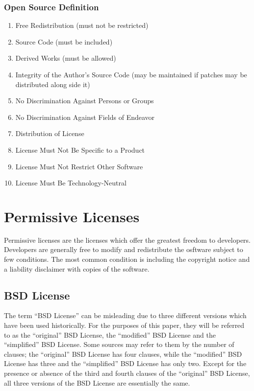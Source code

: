 \documentclass[12pt,letterpaper]{article}
\begin{document}
\subsubsection*{Open Source Definition}
\begin{enumerate}
\item Free Redistribution (must not be restricted)
\item Source Code (must be included)
\item Derived Works (must be allowed)
\item Integrity of the Author's Source Code (may be maintained if patches may be distributed along side it)
\item No Discrimination Against Persons or Groups
\item No Discrimination Against Fields of Endeavor
\item Distribution of License
\item License Must Not Be Specific to a Product
\item License Must Not Restrict Other Software
\item License Must Be Technology-Neutral
\end{enumerate}

\section{Permissive Licenses}

Permissive licenses are the licenses which offer the greatest freedom to developers. Developers are generally free to modify and redistribute the osftware subject to few conditions. The most common condition is including the copyright notice and a liability disclaimer with copies of the software.

\subsection{BSD License}

The term ``BSD License'' can be misleading due to three different versions which have been used historically.\cite{netbsd} For the purposes of this paper, they will be referred to as the ``original'' BSD License, the ``modified'' BSD License and the ``simplified'' BSD License. Some sources may refer to them by the number of clauses; the ``original'' BSD License has four clauses, while the ``modified'' BSD License has three and the ``simplified'' BSD License has only two. Except for the presence or absence of the third and fourth clauses of the ``original'' BSD License, all three versions of the BSD License are essentially the same.
\end{document}
